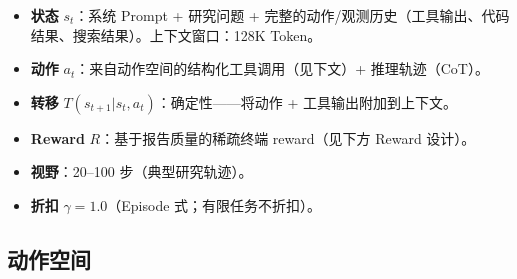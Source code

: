 \begin{keybox}
\begin{itemize}
  \item \textbf{状态} $s_t$：系统 Prompt + 研究问题 + 完整的动作/观测历史（工具输出、代码结果、搜索结果）。上下文窗口：128K Token。
  \item \textbf{动作} $a_t$：来自动作空间的结构化工具调用（见下文）+ 推理轨迹（CoT）。
  \item \textbf{转移} $T(s_{t+1}|s_t, a_t)$：确定性——将动作 + 工具输出附加到上下文。
  \item \textbf{Reward} $R$：基于报告质量的稀疏终端 reward（见下方 Reward 设计）。
  \item \textbf{视野}：20--100 步（典型研究轨迹）。
  \item \textbf{折扣} $\gamma = 1.0$（Episode 式；有限任务不折扣）。
\end{itemize}
\end{keybox}

\subsection{动作空间}
\label{action-space}

